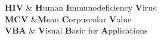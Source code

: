 \clearpage
\pagestyle{fancy} %
{
   \textbf{HIV}     & \textbf{H}uman \textbf{I}mmunodeficiency \textbf{V}irus\\
   \textbf{MCV}		&\textbf{M}ean \textbf{C}orpuscolar \textbf{V}alue \\
   \textbf{VBA}    & \textbf{V}isual \textbf{B}asic for \textbf{A}pplications \\
}